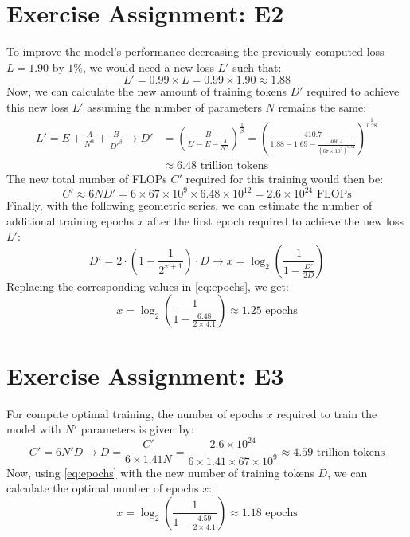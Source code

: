 \documentclass{article}
\begin{document}
\section{Exercise Assignment: E2}\label{sec:e2}
To improve the model's performance decreasing the previously computed loss $L = 1.90$ by $1\%$, we would need a new loss $L'$ such that:
\[
    L' = 0.99 \times L = 0.99 \times 1.90 \approx 1.88
\]
Now, we can calculate the new amount of training tokens $D'$ required to achieve this new loss $L'$ assuming the number of parameters $N$ remains the same:
\begin{align*}
    L' = E + \frac{A}{N^\alpha} + \frac{B}{D'^\beta} \rightarrow D' & = \left(\frac{B}{L' - E - \frac{A}{N^\alpha}}\right)^{\frac{1}{\beta}} = \left(\frac{410.7}{1.88 - 1.69 - \frac{406.4}{(67 \times 10^9)^{0.34}}}\right)^{\frac{1}{0.28}} \\
                                                                    & \approx 6.48 \text{ trillion tokens}
\end{align*}
The new total number of FLOPs $C'$ required for this training would then be:
\[
    C' \approx 6ND' = 6 \times 67 \times 10^9 \times 6.48 \times 10^{12} = 2.6 \times 10^{24} \text{ FLOPs}
\]
Finally, with the following geometric series, we can estimate the number of additional training epochs $x$ after the first epoch required to achieve the new loss $L'$:
\begin{equation}\label{eq:epochs}
    D' = 2 \cdot \left(1 - \frac{1}{2^{x+1}}\right) \cdot D \rightarrow x = \log_2\left(\frac{1}{1 - \frac{D'}{2D}}\right)
\end{equation}
Replacing the corresponding values in \eqref{eq:epochs}, we get:
\[
    x = \log_2\left(\frac{1}{1 - \frac{6.48}{2 \times 4.1}}\right) \approx 1.25 \text{ epochs}
\]

\section{Exercise Assignment: E3}\label{sec:e3}
For compute optimal training, the number of epochs $x$ required to train the model with $N'$ parameters is given by:
\[
    C' = 6N'D \rightarrow D = \frac{C'}{6 \times 1.41N} = \frac{2.6 \times 10^{24}}{6 \times 1.41 \times 67 \times 10^9} \approx 4.59 \text{ trillion tokens}
\]
Now, using \eqref{eq:epochs} with the new number of training tokens $D$, we can calculate the optimal number of epochs $x$:
\[
    x = \log_2\left(\frac{1}{1 - \frac{4.59}{2 \times 4.1}}\right) \approx 1.18 \text{ epochs}
\]
\end{document}

